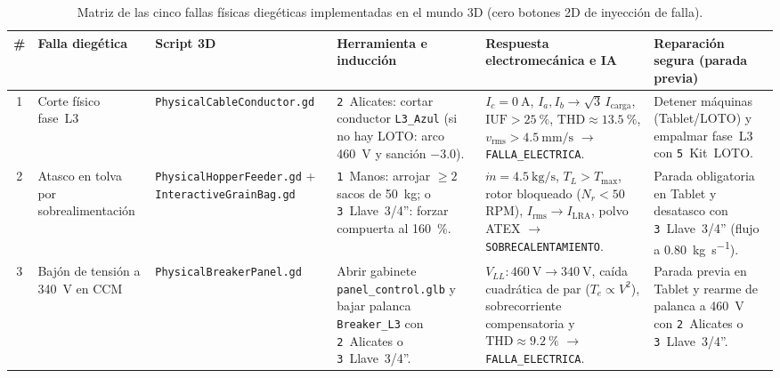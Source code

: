 \begin{table}[!t]
\begingroup\setlength{\tabcolsep}{3.5pt}\renewcommand{\arraystretch}{1.08}
\centering\footnotesize
\caption{Matriz de las cinco fallas físicas diegéticas implementadas en el mundo 3D (cero botones 2D de inyección de falla).}
\label{tab:fallas_diegeticas}
\begin{tabularx}{\textwidth}{@{} c >{\raggedright\arraybackslash}p{2.3cm} >{\raggedright\arraybackslash}p{2.65cm} >{\raggedright\arraybackslash}p{3.1cm} >{\raggedright\arraybackslash}X >{\raggedright\arraybackslash}p{3.25cm} @{}}
\toprule
\textbf{\#} & \textbf{Falla diegética} & \textbf{Script 3D} & \textbf{Herramienta e inducción} & \textbf{Respuesta electromecánica e IA} & \textbf{Reparación segura (parada previa)} \\
\midrule
1 & Corte físico fase~L3 & \texttt{Physical\allowbreak Cable\allowbreak Conductor.gd} & \texttt{2}~Alicates: cortar conductor \texttt{L3\_\allowbreak Azul} (si no hay LOTO: arco \qty{460}{\volt} y sanción \num{-3.0}). & $I_c=\qty{0}{\ampere}$, $I_a,I_b\to\sqrt{3}\,I_{\text{carga}}$, $\text{IUF}>\qty{25}{\percent}$, $\text{THD}\approx\qty{13.5}{\percent}$, $v_{\text{rms}}>\qty{4.5}{\milli\meter\per\second}$ $\to$ \texttt{FALLA\_\allowbreak ELECTRICA}. & Detener máquinas (Tablet/LOTO) y empalmar fase~L3 con \texttt{5}~Kit~LOTO. \\
2 & Atasco en tolva por sobrealimentación & \texttt{Physical\allowbreak Hopper\allowbreak Feeder.gd} + \texttt{Interactive\allowbreak GrainBag.gd} & \texttt{1}~Manos: arrojar $\ge 2$ sacos de \qty{50}{\kilogram}; o \texttt{3}~Llave~3/4'': forzar compuerta al \qty{160}{\percent}. & $\dot{m}=\qty{4.5}{\kilogram\per\second}$, $T_L>T_{\max}$, rotor bloqueado ($N_r<\num{50}$\,RPM), $I_{\text{rms}}\to I_{\text{LRA}}$, polvo ATEX $\to$ \texttt{SOBRE\allowbreak CALENTAMIENTO}. & Parada obligatoria en Tablet y desatasco con \texttt{3}~Llave~3/4'' (flujo a \qty{0.80}{\kilogram\per\second}). \\
3 & Bajón de tensión a \qty{340}{\volt} en CCM & \texttt{Physical\allowbreak Breaker\allowbreak Panel.gd} & Abrir gabinete \texttt{panel\_\allowbreak control.glb} y bajar palanca \texttt{Breaker\_\allowbreak L3} con \texttt{2}~Alicates o \texttt{3}~Llave~3/4''. & $V_{LL}:\qty{460}{\volt}\to\qty{340}{\volt}$, caída cuadrática de par ($T_e\propto V^2$), sobrecorriente compensatoria y $\text{THD}\approx\qty{9.2}{\percent}$ $\to$ \texttt{FALLA\_\allowbreak ELECTRICA}. & Parada previa en Tablet y rearme de palanca a \qty{460}{\volt} con \texttt{2}~Alicates o \texttt{3}~Llave~3/4''. \\

\end{tabularx}
\end{table}
